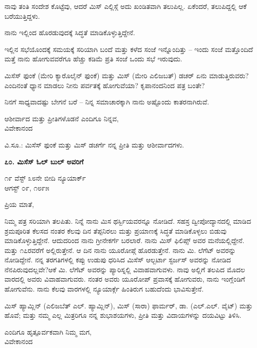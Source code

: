 ನಾವು ತಂತಿ ಸಂದೇಶ ಕೊಟ್ಟೆವು, ಆದರೆ ಮಿಸ್ ಎಲ್ಲಿಸ್ಗೆ ಅದು ಖಂಡಿತವಾಗಿ ತಲುಪಿಲ್ಲ. ಏಕೆಂದರೆ, ತಲುಪಿದ್ದಲ್ಲಿ ಆಕೆ ಬರೆಯುತ್ತಿದ್ದಳು.

ನಾನು ಇಲ್ಲಿಂದ ಹೊರಡುವುದಕ್ಕೆ ಸಿದ್ಧತೆ ಮಾಡಿಕೊಳ್ಳುತ್ತಿದ್ದೇನೆ.

ಇಲ್ಲಿನ ಸಭೆಯೊಂದಕ್ಕೆ ಸಮಯಕ್ಕೆ ಸರಿಯಾಗಿ ಬಂದೆ ಮತ್ತು ಕಳೆದ ಸಂಜೆ ಇನ್ನೊಂದಿತ್ತು – ಇಂದು ಸಂಜೆ ಮತ್ತೊಂದಿದೆ ಮತ್ತೆ ನಾನು ಹೋಗುವವರೆಗೂ ಹೆಚ್ಚು ಕಡಿಮೆ ಪ್ರತಿ ಸಂಜೆ ಒಂದು ಸಭೆ ಇರುವುದು.

ಮಿಸೆಸ್ ಫುಂಕೆ (ಮೇರಿ ಕ್ಯಾರೊಲೈನ್ ಫುಂಕೆ) ಮತ್ತು ಮಿಸ್ (ಮೇರಿ ಎಲಿಜಬತ್) ಡಚರ್ ಏನು ಮಾಡುತ್ತಿರುವರು? ಎಂದಿನಂತೆ ಧ್ಯಾನ ಮಾಡಲು ನೀನು ಪರ್ವತಕ್ಕೆ ಹೋಗುವೆಯಾ? ಕೃಪಾನಂದನಿಂದ ಪತ್ರ ಬಂತೇ?

ನಿನಗೆ ಸಾಧ್ಯವಾದಷ್ಟು ಬೇಗನೆ ಬರೆ – ನಿನ್ನ ಸಮಾಚಾರಕ್ಕಾಗಿ ನಾನು ಅಷ್ಟೊಂದು ಕಾತರನಾಗಿರುವೆ.

\begin{flushright}
ಆಶೀರ್ವಾದ ಮತ್ತು ಪ್ರೀತಿಗಳೊಡನೆ ಎಂದಿಗೂ ನಿನ್ನವ,\\ವಿವೇಕಾನಂದ
\end{flushright}

ವಿ.ಸೂ.: ಮಿಸೆಸ್ ಫುಂಕೆ ಮತ್ತು ಮಿಸ್ ಡಚರ್ಗೆ ನನ್ನ ಪ್ರೀತಿ ಮತ್ತು ಆಶೀರ್ವಾದಗಳು.

\begin{center}
\textbf{೭೦. ಮಿಸೆಸ್ ಓಲ್ ಬುಲ್ ಅವರಿಗೆ}
\end{center}

\begin{flushright}
೧೯ ವೆಸ್ಟ್ ೩೮ನೇ ಬೀದಿ ನ್ಯೂಯಾರ್ಕ್\\ಆಗಸ್ಟ್ ೦೯, ೧೮೯೫
\end{flushright}

ಪ್ರಿಯ ಮಾತೆ,

ನಿಮ್ಮ ಪತ್ರ ಸರಿಯಾಗಿ ತಲಪಿತು. ನಿನ್ನೆ ನಾನು ಮಿಸ ಥರ್ಸ್ಬಿಯವರನ್ನೂ ನೋಡಿದೆ. ಸಹಸ್ರ ದ್ವೀಪೋದ್ಯಾನದಲ್ಲಿ ಮಾಡಿದ ಶ್ರಮಪೂರಿತ ಕೆಲಸದ ನಂತರ ಕೆಲವು ದಿನ ತೆಪ್ಪನಿರಲು ಮತ್ತು ಪ್ರಯಾಣಕ್ಕೆ ಸಿದ್ಧತೆ ಮಾಡಿಕೊಳ್ಳಲು ಬಿಡುವು ಮಾಡಿಕೊಳ್ಳುತ್ತಿದ್ದೇನೆ. ಆದುದರಿಂದ ನಾನು ಗ್ರೀನೇಕರ್ಗೆ ಬರಲಾರೆ. ನಾನು ಮಿಸ್ ಫಿಲಿಪ್ಸ್ ಅವರ ಮನೆಯಲ್ಲಿದ್ದೇನೆ. ಮತ್ತು ೧೭ರವರೆಗೆ ಅಲ್ಲಿರುತ್ತೇನೆ. ಆ ದಿನ ನಾನು ಯೂರೋಪ್ಗೆ ಹೊರಡುತ್ತೇನೆ. ನಾನು ಮಿ. ಲೆಗೆಟ್ ಅವರನ್ನು ನೋಡಿದ್ದೇನೆ. ನನ್ನ ತರಗತಿಗಳಲ್ಲಿ ಕಪ್ಪು ಉಡುಪು ಧರಿಸಿದ ಮಿಸೆಸ್ ಆಲ್ಬರ್ಟಾ ಸ್ಟರ್ಜಸ್ ಅವರನ್ನು ನೋಡಿದ ನೆನಪಿರುವುದಲ್ಲವೇ?ಆಕೆ ಮಿ. ಲೆಗೆಟ್ ಅವರನ್ನು ಪ್ಯಾರಿಸ್ನಲ್ಲಿ ವಿವಾಹವಾಗುವಳು. ನಾವು ಅಲ್ಲಿಗೆ ತಲಪಿದ ಮೊದಲ ವಾರದಲ್ಲಿ ಅವರು ವಿವಾಹವಾಗುವರು. ನಂತರ ಅವರು ಯೂರೋಪ್ ಪ್ರವಾಸಕ್ಕೆ ಹೋಗುವರು, ನಾನು ಇಂಗ್ಲೆಂಡಿಗೆ ಹೋಗುವೆನು. ನಾನು ಕೆಲವು ವಾರಗಳಲ್ಲಿ ನ್ಯೂಯಾರ್ಕ್ಗೆ ಹಿಂತಿರುಗ ಬಹುದೆಂದು ಭಾವಿಸುತ್ತೇನೆ.

ಮಿಸ್ ಹ್ಯಾಮ್ಲಿನ್ (ಎಲಿಜಬೆತ್ ಎಲ್. ಹ್ಯಾಮ್ಲಿನ್), ಮಿಸ್ (ಸಾರಾ) ಫಾರ್ಮರ್, ಡಾ. (ಎಲ್.ಎಲ್. ವೈಟ್) ಮತ್ತು ಹೊವೆ; ಮತ್ತು ನಮ್ಮ ಎಲ್ಲ ಮಿತ್ರರಿಗೂ ನನ್ನ ಶುಭಾಶಯಗಳು, ಪ್ರೀತಿ ಮತ್ತು ವಿದಾಯಗಳನ್ನು ದಯವಿಟ್ಟು ತಿಳಿಸಿ.

\begin{flushright}
ಎಂದಿಗೂ ಹೃತ್ಪೂರ್ವಕವಾಗಿ ನಿಮ್ಮ ಮಗ,\\ವಿವೇಕಾನಂದ
\end{flushright}

